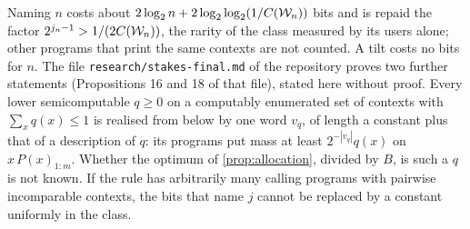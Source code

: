 Naming $n$ costs about $2\log_2n+2\log_2\log_2(1/C(\mathcal W_n))$ bits and is repaid the factor
$2^{j_n-1}>1/(2C(\mathcal W_n))$, the rarity of the class measured by its users alone; other programs that print the
same contexts are not counted. A tilt costs no bits for $n$. The file \texttt{research/stakes-final.md} of the
repository proves two further statements (Propositions 16 and 18 of that file), stated here without proof.
Every lower semicomputable $q\ge0$ on a computably enumerated set of contexts with $\sum_xq(x)\le1$ is
realised from below by one word $v_q$, of length a constant plus that of a description of $q$: its programs
put mass at least $2^{-|v_q|}q(x)$ on $x\,P(x)_{1:m}$. Whether the optimum of \cref{prop:allocation}, divided
by $B$, is such a $q$ is not known. If the rule has arbitrarily many calling programs with pairwise
incomparable contexts, the bits that name $j$ cannot be replaced by a constant uniformly in the class.

